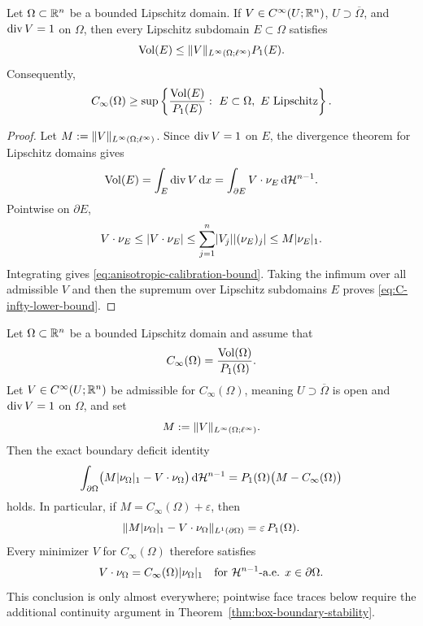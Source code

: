 \begin{lemma}
\label{lem:boundary-calibration}
Let $\Omega\subset\mathbb{R}^n$ be a bounded Lipschitz domain. If
$V\in C^\infty(U;\mathbb{R}^n)$, $U\supset\overline\Omega$, and $\operatorname{div} V=1$ on
$\Omega$, then every Lipschitz subdomain $E\subset\Omega$ satisfies
\begin{equation}
\label{eq:anisotropic-calibration-bound}
\operatorname{Vol}(E)\le \lVert V \rVert_{L^\infty(\Omega;\ell^\infty)}P_1(E).
\end{equation}
Consequently,
\begin{equation}
\label{eq:C-infty-lower-bound}
C_\infty(\Omega)\ge
\sup\left\{\frac{\operatorname{Vol}(E)}{P_1(E)}:\ E\subset\Omega,\ E\ {\rm Lipschitz}\right\}.
\end{equation}
\end{lemma}

\begin{proof}
Let $M:=\lVert V \rVert_{L^\infty(\Omega;\ell^\infty)}$. Since $\operatorname{div} V=1$ on $E$,
the divergence theorem for Lipschitz domains gives
\[
\operatorname{Vol}(E)=\int_E\operatorname{div} V\,\mathrm{d} x
=\int_{\partial E}V\cdot\nu_E\,\mathrm{d}\mathcal{H}^{n-1}.
\]
Pointwise on $\partial E$,
\[
V\cdot\nu_E
\le
\lvert V\cdot\nu_E \rvert
\le
\sum_{j=1}^n\lvert V_j \rvert\lvert (\nu_E)_j \rvert
\le
M\lvert \nu_E \rvert_1 .
\]
Integrating gives \eqref{eq:anisotropic-calibration-bound}. Taking the
infimum over all admissible $V$ and then the supremum over Lipschitz
subdomains $E$ proves \eqref{eq:C-infty-lower-bound}.
\end{proof}

\begin{proposition}
\label{prop:quantitative-boundary-saturation}
Let $\Omega\subset\mathbb{R}^n$ be a bounded Lipschitz domain and assume that
\[
C_\infty(\Omega)=\frac{\operatorname{Vol}(\Omega)}{P_1(\Omega)}.
\]
Let $V\in C^\infty(U;\mathbb{R}^n)$ be admissible for $C_\infty(\Omega)$, meaning
$U\supset\overline\Omega$ is open and $\operatorname{div} V=1$ on $\Omega$, and set
\[
M:=\lVert V \rVert_{L^\infty(\Omega;\ell^\infty)}.
\]
Then the exact boundary deficit identity
\begin{equation}
\label{eq:boundary-deficit-identity}
\int_{\partial\Omega}
\bigl(M\lvert \nu_\Omega \rvert_1-V\cdot\nu_\Omega\bigr)\,\mathrm{d}\mathcal{H}^{n-1}
=
P_1(\Omega)\bigl(M-C_\infty(\Omega)\bigr)
\end{equation}
holds. In particular, if $M=C_\infty(\Omega)+\varepsilon$, then
\[
\lVert M\lvert \nu_\Omega \rvert_1-V\cdot\nu_\Omega \rVert_{L^1(\partial\Omega)}
=
\varepsilon\,P_1(\Omega).
\]
Every minimizer $V$ for $C_\infty(\Omega)$ therefore satisfies
\[
V\cdot\nu_\Omega
=C_\infty(\Omega)\lvert \nu_\Omega \rvert_1
\quad\text{for }\mathcal{H}^{n-1}\text{-a.e. }x\in\partial\Omega .
\]
This conclusion is only almost everywhere; pointwise face traces below require
the additional continuity argument in Theorem~\ref{thm:box-boundary-stability}.
\end{proposition}

